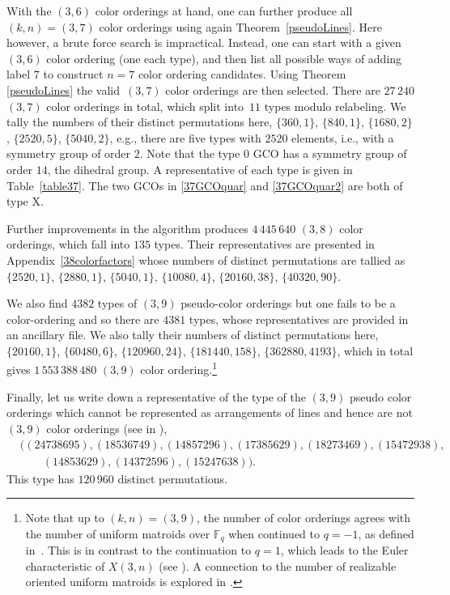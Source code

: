 \documentclass[pdftex]{sigma}
\theoremstyle{definition}
\numberwithin{equation}{section}
\begin{document}
With the $(3,6)$ color orderings at hand, one can further produce all
$(k,n)=(3,7)$ color orderings using again Theorem~\ref{pseudoLines}. Here however, a brute force search is impractical. Instead, one can start with a given $(3,6)$ color ordering (one each type), and then list all possible ways of adding label $7$ to construct $n=7$ color ordering candidates. Using Theorem \ref{pseudoLines} the valid~$(3,7)$ color orderings are then selected. There are $27\,240$ $(3,7)$ color orderings in total, which split into~$11$ types modulo relabeling. We tally the numbers of their distinct permutations here,
$\{360,1\}$, $\{ 840,1\}$, $\{1680,2\}$, $\{ 2520, 5\}$, $\{5040, 2\}$, e.g., there are five types with $2520$ elements, i.e., with a symmetry group of order $2$. Note that the type 0 GCO has a symmetry group of order $14$, the dihedral group. A representative of each type is given in Table~\ref{table37}. The two GCOs in \eqref{37GCOquar} and \eqref{37GCOquar2} are both of type X.

Further improvements in the algorithm produces $4 \,445\, 640$ $(3,8)$ color orderings, which fall into $135$ types. Their representatives are presented in Appendix~\ref{38colorfactors} whose numbers of distinct permutations are tallied as
$\{2520, 1\}$, $\{2880, 1\}$, $\{5040, 1\}$, $\{10080, 4\}$, $\{20160, 38\}$, $\{40320,
 90\}$.

We also find $4382$ types of $(3,9)$ pseudo-color orderings but one fails to be a color-ordering and so there are $4381$ types, whose representatives are provided in an ancillary file. We also tally their numbers of distinct permutations here,
$\{20160, 1\}$, $\{60480, 6\}$, $\{120960, 24\}$, $\{181440, 158\}$, $\{362880, 4193\}$,
 which in total gives $ 1 \,553\,388\, 480$ $(3,9)$ color ordering.\footnote{Note that up to $(k,n)=(3,9)$, the number of color orderings agrees with the number of uniform matroids over $\mathbb{F}_q$ when continued to $q=-1$, as defined in~\cite{skorobogatov1996number}. This is in contrast to the continuation to $q=1$, which leads to the Euler characteristic of $X(3,n)$ (see \cite[Appendix~A]{Agostini:2021rze}). A connection to the number of realizable oriented uniform matroids is explored in \cite{Cachazo:2023ltw}.}

Finally, let us write down a representative of the type of the $(3,9)$ pseudo color orderings which cannot be represented as arrangements of lines and hence are not $(3,9)$ color orderings (see in \cite[Figure 13]{celaya2020oriented}),
\begin{align*}
&((24738695),(18536749),(14857296), (17385629),(18273469),(15472938),
\\
&\qquad(14853629),(14372596),(15247638)
).
\end{align*}
This type has $120\, 960$ distinct permutations.
\end{document}
